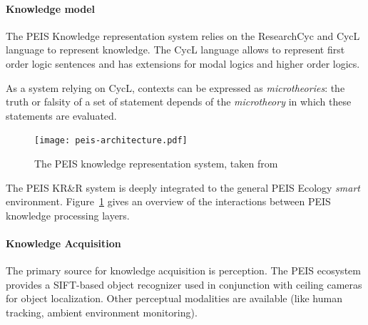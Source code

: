 \documentclass[a4paper, twocolumn]{article}
\begin{document}

\paragraph{Knowledge model} The PEIS Knowledge representation system relies on
the {\sc ResearchCyc} and {\sc CycL} language to represent knowledge. The {\sc CycL} language
allows to represent first order logic sentences and has extensions for modal logics and higher order logics.


As a system relying on {\sc CycL}, contexts can be expressed as
\emph{microtheories}: the truth or falsity of a set of statement depends of the
\emph{microtheory} in which these statements are evaluated.


\begin{figure}
	\centering
	\texttt{[image: peis-architecture.pdf]}
	\caption{The PEIS knowledge representation system, taken from~\cite{Daoutis2009}}
	\label{fig|peis-archi}
\end{figure}

The PEIS KR\&R system is deeply integrated to the general PEIS Ecology
\emph{smart} environment. Figure~\ref{fig|peis-archi} gives an overview of the
interactions between PEIS knowledge processing layers.

\paragraph{Knowledge Acquisition} The primary source for knowledge acquisition
is perception.  The PEIS ecosystem provides a SIFT-based object recognizer used
in conjunction with ceiling cameras for object localization.  Other perceptual
modalities are available (like human tracking, ambient environment monitoring).
\end{document}
